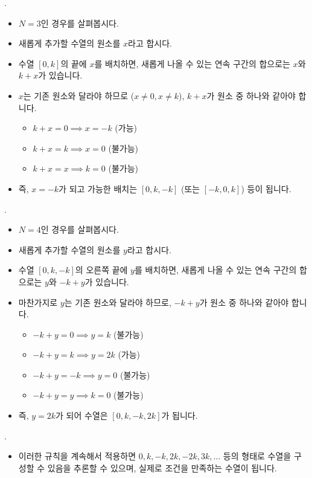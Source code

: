 \begin{frame}{\probno{}. \probtitle{}}
    \begin{itemize}
        \item $N=3$인 경우를 살펴봅시다.
        \item 새롭게 추가할 수열의 원소를 $x$라고 합시다.
        \item 수열 $[0, k]$의 끝에 $x$를 배치하면, 새롭게 나올 수 있는 연속 구간의 합으로는 $x$와 $k+x$가 있습니다.
        \item $x$는 기존 원소와 달라야 하므로 ($x \neq 0, x \neq k$), $k+x$가 원소 중 하나와 같아야 합니다.
        \begin{itemize}
            \item $k+x = 0 \implies x=-k$ (가능)
            \item $k+x = k \implies x=0$ (불가능)
            \item $k+x = x \implies k=0$ (불가능)
        \end{itemize}
        \item 즉, $x=-k$가 되고 가능한 배치는 $[0, k, -k]$ (또는 $[-k, 0, k]$) 등이 됩니다.
    \end{itemize}
\end{frame}

\begin{frame}{\probno{}. \probtitle{}}
    \begin{itemize}
        \item $N=4$인 경우를 살펴봅시다.
        \item 새롭게 추가할 수열의 원소를 $y$라고 합시다.
        \item 수열 $[0, k, -k]$의 오른쪽 끝에 $y$를 배치하면, 새롭게 나올 수 있는 연속 구간의 합으로는 $y$와 $-k+y$가 있습니다.
        \item 마찬가지로 $y$는 기존 원소와 달라야 하므로, $-k+y$가 원소 중 하나와 같아야 합니다.
        \begin{itemize}
            \item $-k+y = 0 \implies y=k$ (불가능)
            \item $-k+y = k \implies y=2k$ (가능)
            \item $-k+y = -k \implies y=0$ (불가능)
            \item $-k+y = y \implies k=0$ (불가능)
        \end{itemize}
        \item 즉, $y=2k$가 되어 수열은 $[0, k, -k, 2k]$가 됩니다.
    \end{itemize}
\end{frame}

\begin{frame}{\probno{}. \probtitle{}}
    \begin{itemize}
        \item 이러한 규칙을 계속해서 적용하면 $0, k, -k, 2k, -2k, 3k, \dots$ 등의 형태로 수열을 구성할 수 있음을 추론할 수 있으며, 실제로 조건을 만족하는 수열이 됩니다.
    \end{itemize}
\end{frame}